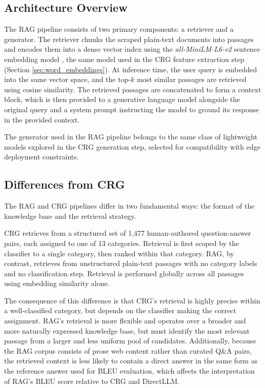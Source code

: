 \documentclass[conference]{IEEEtran}
\begin{document}
\subsection{Architecture Overview}
The RAG pipeline consists of two primary components: a retriever and a generator.
The retriever chunks the scraped plain-text documents into passages and encodes them into a dense vector index using the \textit{all-MiniLM-L6-v2} sentence embedding model \cite{b15} \cite{b16}, the same model used in the CRG feature extraction step (Section \ref{sec:word_embeddings}).
At inference time, the user query is embedded into the same vector space, and the top-$k$ most similar passages are retrieved using cosine similarity.
The retrieved passages are concatenated to form a context block, which is then provided to a generative language model alongside the original query and a system prompt instructing the model to ground its response in the provided context.

The generator used in the RAG pipeline belongs to the same class of lightweight models explored in the CRG generation step, selected for compatibility with edge deployment constraints.

\subsection{Differences from CRG}
The RAG and CRG pipelines differ in two fundamental ways: the format of the knowledge base and the retrieval strategy.

CRG retrieves from a structured set of 1,477 human-authored question-answer pairs, each assigned to one of 13 categories.
Retrieval is first scoped by the classifier to a single category, then ranked within that category.
RAG, by contrast, retrieves from unstructured plain-text passages with no category labels and no classification step.
Retrieval is performed globally across all passages using embedding similarity alone.

The consequence of this difference is that CRG's retrieval is highly precise within a well-classified category, but depends on the classifier making the correct assignment.
RAG's retrieval is more flexible and operates over a broader and more naturally expressed knowledge base, but must identify the most relevant passage from a larger and less uniform pool of candidates.
Additionally, because the RAG corpus consists of prose web content rather than curated Q\&A pairs, the retrieved context is less likely to contain a direct answer in the same form as the reference answer used for BLEU evaluation, which affects the interpretation of RAG's BLEU score relative to CRG and DirectLLM.
\end{document}
